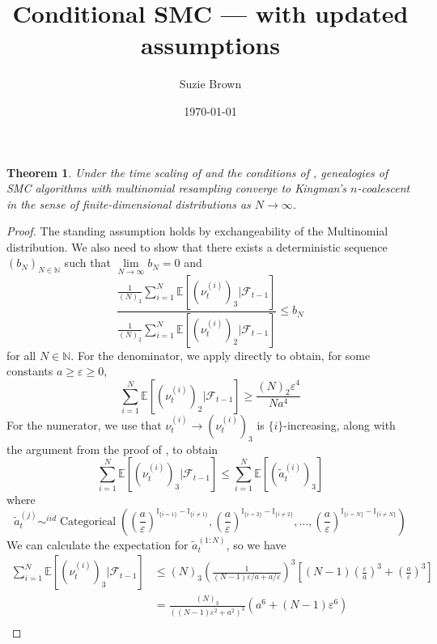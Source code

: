 \documentclass[fleqn]{article}
\title{Conditional SMC --- with updated assumptions}
\author{Suzie Brown}
\date{\today}
\newtheorem{thm}{Theorem}
\theoremstyle{definition}
\newcommand{\N}{\mathbb{N}}
\newcommand{\E}{\mathbb{E}}
\newcommand{\I}[1]{\mathbb{I}_{\{#1\}}}
\newcommand{\limNtoinfty}{\underset{N\to\infty}{\lim}}
\newcommand{\Cat}{\operatorname{Categorical}}
\newcommand{\F}{\mathcal{F}_{t-1}}
\newcommand{\vt}[2][t]{\nu_{#1}^{(#2)}}
\begin{document}
\maketitle
\thispagestyle{fancy}

\begin{thm}\label{thm:mn_newassns}
Under the time scaling of \citet[Theorem 1]{koskela2018} and the conditions of \citet[Lemma 3]{koskela2018}, genealogies of SMC algorithms with multinomial resampling converge to Kingman's $n$-coalescent in the sense of finite-dimensional distributions as $N\to\infty$.
\end{thm}

\begin{proof}
The standing assumption holds by exchangeability of the Multinomial distribution.
We also need to show that there exists a deterministic sequence $(b_N)_{N\in\N}$ such that $\limNtoinfty b_N =0$ and
\begin{equation}\label{eq:mn_ratiobound}
\frac{\frac{1}{(N)_3}\sum_{i=1}^N \E[(\vt{i})_3 |\F]}{\frac{1}{(N)_2} \sum_{i=1}^N \E[(\vt{i})_2 |\F]} \leq b_N
\end{equation}
for all $N \in \N$. 
For the denominator, we apply \citet[Lemma 3]{koskela2018} directly to obtain, for some constants $a\geq \varepsilon\geq0$,
\begin{equation*}
\sum_{i=1}^N \E[(\vt{i})_2 |\F] \geq \frac{(N)_2 \varepsilon^4}{Na^4}
\end{equation*}
For the numerator, we use that $\vt{i} \longrightarrow (\vt{i})_3$ is $\{i\}$-increasing, along with the argument from the proof of \citet[Lemma 3]{koskela2018}, to obtain
\begin{equation*}
\sum_{i=1}^N \E[(\vt{i})_3 |\F] \leq \sum_{i=1}^N  \E[(\tilde{a}_t^{(i)})_3]
\end{equation*}
where
\begin{equation}
\tilde{a}_t^{(j)} \sim^{iid} \Cat \left( \left(\frac{a}{\varepsilon}\right)^{\I{i=1}-\I{i\neq 1}}, \left(\frac{a}{\varepsilon}\right)^{\I{i=2}-\I{i\neq 2}}, \dots, \left(\frac{a}{\varepsilon}\right)^{\I{i=N}-\I{i\neq N}} \right)
\end{equation}
We can calculate the expectation for $\tilde{a}_t^{(1:N)}$, so we have
\begin{align*}
\sum_{i=1}^N \E[(\vt{i})_3 |\F] &\leq 
(N)_3 \left( \frac{1}{(N-1)\varepsilon/a + a/\varepsilon} \right)^3 \left[ (N-1)\left(\frac{\varepsilon}{a}\right)^3 + \left(\frac{a}{\varepsilon}\right)^3 \right] \\
&= \frac{(N)_3}{\left((N-1)\varepsilon^2 + a^2\right)^3}\left(a^6 + (N-1)\varepsilon^6\right) \\

\end{align*}
\end{proof}
\end{document}
